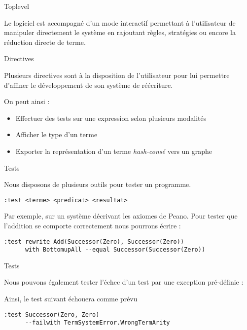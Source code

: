 \begin{frame}{Toplevel}

Le logiciel est accompagné d'un mode interactif permettant à
l'utilisateur de manipuler directement le système en rajoutant règles,
stratégies ou encore la réduction directe de terme.

\end{frame}

\begin{frame}{Directives}

Plusieurs directives sont à la disposition de l'utilisateur pour lui
permettre d'affiner le développement de son système de réécriture.
\bigskip

On peut ainsi : 
\begin{itemize}
\item Effectuer des tests sur une expression selon plusieurs modalités
\item Afficher le type d'un terme
\item Exporter la représentation d'un terme \emph{hash-consé} vers un graphe
\end{itemize}

\end{frame}

\begin{frame}[fragile]{Tests}

Nous disposons de plusieurs outils pour tester un programme.
\medskip

\begin{verbatim} 
:test <terme> <predicat> <resultat> 
\end{verbatim}

Par exemple, sur un système décrivant les axiomes de Peano. Pour
tester que l'addition se comporte correctement nous pourrons écrire :

\begin{verbatim}
:test rewrite Add(Successor(Zero), Successor(Zero)) 
      with BottomupAll --equal Successor(Successor(Zero))
\end{verbatim}

\end{frame}

\begin{frame}[fragile]{Tests}

Nous pouvons également tester l'échec d'un test par une exception pré-définie :
\medskip

Ainsi, le test suivant échouera comme prévu
\begin{verbatim}
:test Successor(Zero, Zero) 
      --failwith TermSystemError.WrongTermArity
\end{verbatim}

\end{frame}

